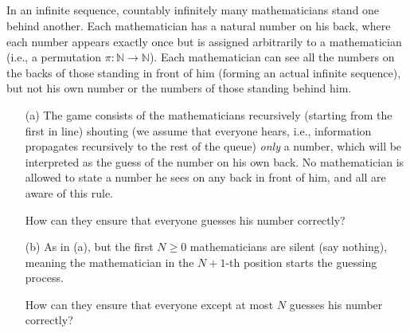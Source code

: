 \documentclass[11pt, a4paper, oneside]{article}
\theoremstyle{remark}
\begin{document}
\subsection{}
In an infinite sequence, countably infinitely many mathematicians stand one behind another. Each mathematician has a natural number on his back, where each number appears exactly once but is assigned arbitrarily to a mathematician (i.e., a permutation \(\pi: \mathbb{N} \to \mathbb{N}\)). Each mathematician can see all the numbers on the backs of those standing in front of him (forming an actual infinite sequence), but not his own number or the numbers of those standing behind him.

\begin{enumerate}
    \item[(a)] The game consists of the mathematicians recursively (starting from the first in line) shouting (we assume that everyone hears, i.e., information propagates recursively to the rest of the queue) \textit{only} a number, which will be interpreted as the guess of the number on his own back. No mathematician is allowed to state a number he sees on any back in front of him, and all are aware of this rule.
    
    How can they ensure that everyone guesses his number correctly?

    \item[(b)] As in (a), but the first \(N \geq 0\) mathematicians are silent (say nothing), meaning the mathematician in the \(N+1\)-th position starts the guessing process.
    
    How can they ensure that everyone except at most \(N\) guesses his number correctly?
\end{enumerate}
\printbibliography
\end{document}

